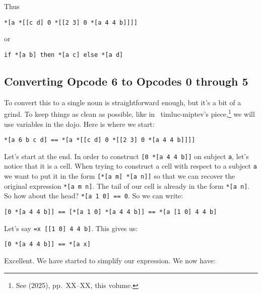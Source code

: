 \documentclass[twoside]{article}
\begin{document}
Thus

\begin{lstlisting}[style=listingblock]
*[a *[[c d] 0 *[[2 3] 0 *[a 4 4 b]]]]
\end{lstlisting}

\noindent
or

\begin{lstlisting}[style=listingblock]
if *[a b] then *[a c] else *[a d]
\end{lstlisting}

\subsection*{Converting Opcode 6 to Opcodes 0 through 5}

To convert this to a single noun is straightforward enough, but it's a bit of a grind. To keep things as clean as possible, like in ~timluc-miptev's piece,\footnote{See  (2025), pp.~XX--XX, this volume.} we will use variables in the dojo. Here is where we start:

\begin{lstlisting}[style=listingcode]
*[a 6 b c d] == *[a *[[c d] 0 *[[2 3] 0 *[a 4 4 b]]]]
\end{lstlisting}

Let's start at the end. In order to construct \lstinline[style=inlinecode]{[0 *[a 4 4 b]]} on subject \lstinline[style=inlinecode]{a}, let's notice that it is a cell. When trying to construct a cell with respect to a subject \lstinline[style=inlinecode]{a} we want to put it in the form \lstinline[style=inlinecode]{[*[a m] *[a n]]} so that we can recover the original expression \lstinline[style=inlinecode]{*[a m n]}. The tail of our cell is already in the form \lstinline[style=inlinecode]{*[a n]}. So how about the head? \lstinline[style=inlinecode]{*[a 1 0] == 0}. So we can write:

\begin{lstlisting}[style=listingblock]
[0 *[a 4 4 b]] == [*[a 1 0] *[a 4 4 b]] == *[a [1 0] 4 4 b]
\end{lstlisting}

\noindent
Let's say \lstinline[style=inlinecode]{=x [[1 0] 4 4 b]}. This gives us:

\begin{lstlisting}[style=listingblock]
[0 *[a 4 4 b]] == *[a x]
\end{lstlisting}

\noindent
Excellent. We have started to simplify our expression. We now have:
\end{document}

